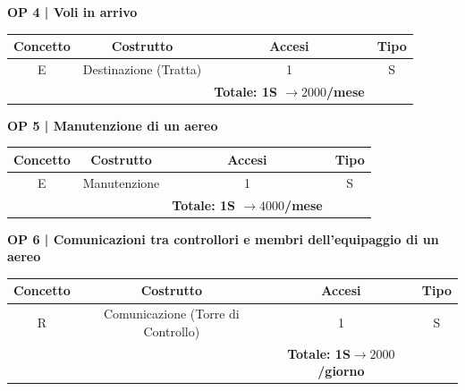 
\textbf{\small OP 4 | Voli in arrivo}\\

\begin{tabular}{ c c c c} %
	\hline
	\textbf{Concetto} & \textbf{Costrutto} & \textbf{Accesi} & \textbf{Tipo}\\
	\hline
	\textsf{\small E} & \textsf{\small Destinazione (Tratta)} & \textsf{\small 1} &  \textsf{\small S}\\
	\hline
	\textsf{\small } & \textsf{\small } & \textbf{Totale: 1S $\rightarrow 2000$/mese } \textsf{\small } & \textsf{\small }\\
	\hline
\end{tabular}

\vspace{.6cm}


\textbf{\small OP 5 | Manutenzione di un aereo}\\

\begin{tabular}{ c c c c} %
	\hline
	\textbf{Concetto} & \textbf{Costrutto} & \textbf{Accesi} & \textbf{Tipo}\\
	\hline
	\textsf{\small E} & \textsf{\small Manutenzione} & \textsf{\small 1} &  \textsf{\small S}\\
	\hline
	\textsf{\small } & \textsf{\small } & \textbf{Totale: 1S $\rightarrow 4000$/mese} \textsf{\small } & \textsf{\small }\\
	\hline
\end{tabular}

\vspace{.6cm}


\textbf{\small OP 6 | Comunicazioni tra controllori e membri dell'equipaggio di un aereo}\\

\begin{tabular}{ c c c c} %
	\hline
	\textbf{Concetto} & \textbf{Costrutto} & \textbf{Accesi} & \textbf{Tipo}\\
	\hline
	\textsf{\small R} & \textsf{\small Comunicazione (Torre di Controllo)} & \textsf{\small 1} &  \textsf{\small S}\\
	\hline
	\textsf{\small } & \textsf{\small } & \textbf{Totale: 1S$\rightarrow 2000$/giorno } \textsf{\small } & \textsf{\small }\\
	\hline
\end{tabular}

